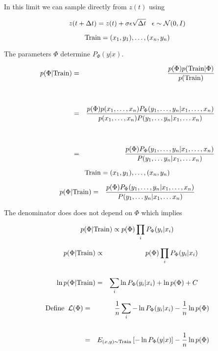 {In this limit we can sample directly from $z(t)$ using

$$z(t + \Delta t) = z(t) + \sigma\epsilon \sqrt{\Delta t}\;\;\;\epsilon \sim {\cal N}(0,I)$$


{\huge
$$\mathrm{Train} = (x_1,y_1),\ldots,(x_n,y_n)$$

\vfill
The parameters $\Phi$ determine $P_\Phi(y|x)$.

\begin{eqnarray*}
p(\Phi|\mathrm{Train}) & = & \frac{p(\Phi)p(\mathrm{Train}|\Phi)}{p(\mathrm{Train})} \\
\\
\\
& = & \frac{p(\Phi)p(x_1,\ldots,x_n)P_\Phi(y_1,\ldots,y_n|x_1,\ldots,x_n)}{p(x_1,\ldots,x_n)P(y_1,\ldots y_n|x_1,\ldots x_n)} \\
\\
\\
& = & \frac{p(\Phi)P_\Phi(y_1,\ldots,y_n|x_1,\ldots,x_n)}{P(y_1,\ldots y_n|x_1,\ldots x_n)}
\end{eqnarray*}
}


$$\mathrm{Train} = (x_1,y_1),\ldots,(x_n,y_n)$$

\vfill
{\huge
\begin{eqnarray*}
p(\Phi|\mathrm{Train}) & = & \frac{p(\Phi)P_\Phi(y_1,\ldots,y_n|x_1,\ldots,x_n)}{P(y_1,\ldots y_n|x_1,\ldots x_n)}
\end{eqnarray*}
}

\vfill
The denominator does does not depend on $\Phi$ which implies

$$p(\Phi|\mathrm{Train}) \propto p(\Phi)\prod_i P_\Phi(y_i|x_i)$$



{\huge
\begin{eqnarray*}
p(\Phi|\mathrm{Train}) & \propto & p(\Phi)\prod_i P_\Phi(y_i|x_i) \\
\\
\ln p(\Phi|\mathrm{Train}) & = & \sum_i \ln P_\Phi(y_i|x_i) + \ln p(\Phi) + C
\end{eqnarray*}

\vfill
\begin{eqnarray*}
\mathrm{Define}\;\;{\cal L}(\Phi) & = & \frac{1}{n} \sum_i -\ln P_\Phi(y_i|x_i) - \frac{1}{n} \ln p(\Phi) \\
\\
& = & E_{(x,y) \sim \mathrm{Train}}\left[ -\ln P_\Phi(y|x)\right] - \frac{1}{n} \ln p(\Phi)
\end{eqnarray*}

}}
